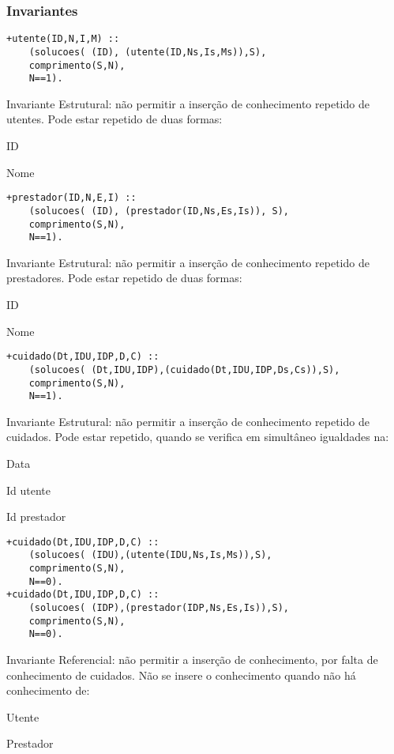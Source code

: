 \documentclass[a4paper]{report} %
\begin{document}
\subsubsection{Invariantes}
\begin{verbatim}
+utente(ID,N,I,M) :: 
    (solucoes( (ID), (utente(ID,Ns,Is,Ms)),S),
    comprimento(S,N), 
    N==1).
\end{verbatim}

Invariante Estrutural: não permitir a inserção de conhecimento repetido de utentes. Pode estar repetido de duas formas:
\begin{arrowlist}
\item ID
\item Nome
\end{arrowlist}

\begin{verbatim}
+prestador(ID,N,E,I) :: 
    (solucoes( (ID), (prestador(ID,Ns,Es,Is)), S),
    comprimento(S,N),
    N==1).
\end{verbatim}

Invariante Estrutural: não permitir a inserção de conhecimento repetido de prestadores. Pode estar repetido de duas formas:
\begin{arrowlist}
\item ID
\item Nome
\end{arrowlist}

\begin{verbatim}
+cuidado(Dt,IDU,IDP,D,C) :: 
    (solucoes( (Dt,IDU,IDP),(cuidado(Dt,IDU,IDP,Ds,Cs)),S),
    comprimento(S,N),
    N==1).
\end{verbatim}

Invariante Estrutural: não permitir a inserção de conhecimento repetido de cuidados. Pode estar repetido, quando se verifica em simultâneo igualdades na:
\begin{arrowlist}
\item Data
\item Id utente
\item Id prestador
\end{arrowlist}

\begin{verbatim}
+cuidado(Dt,IDU,IDP,D,C) :: 
    (solucoes( (IDU),(utente(IDU,Ns,Is,Ms)),S),
    comprimento(S,N),
    N==0).
+cuidado(Dt,IDU,IDP,D,C) :: 
    (solucoes( (IDP),(prestador(IDP,Ns,Es,Is)),S),
    comprimento(S,N),
    N==0).
\end{verbatim}

Invariante Referencial: não permitir a inserção de conhecimento, por falta de conhecimento de cuidados. Não se insere o conhecimento quando não há conhecimento de:
\begin{arrowlist}
\item Utente
\item Prestador
\end{arrowlist}
\end{document}
